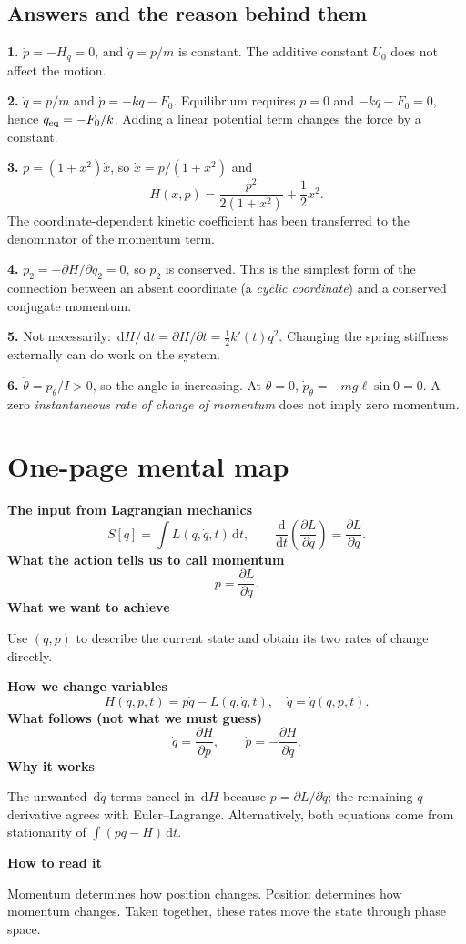 \documentclass[11pt,a4paper,oneside]{article}
\newcommand{\dd}{\,\mathrm d}
\newcommand{\pd}[2]{\frac{\partial #1}{\partial #2}}
\newcommand{\dt}[1]{\frac{\mathrm d #1}{\mathrm d t}}
\begin{document}
\subsection*{Answers and the reason behind them}
\textbf{1.} $\dot p=-H_q=0$, and $\dot q=p/m$ is constant. The additive constant $U_0$ does not affect the motion.

\textbf{2.} $\dot q=p/m$ and $\dot p=-kq-F_0$. Equilibrium requires $p=0$ and $-kq-F_0=0$, hence $q_{\rm eq}=-F_0/k$. Adding a linear potential term changes the force by a constant.

\textbf{3.} $p=(1+x^2)\dot x$, so $\dot x=p/(1+x^2)$ and
\[
 H(x,p)=\frac{p^2}{2(1+x^2)}+\frac12x^2.
\]
The coordinate-dependent kinetic coefficient has been transferred to the denominator of the momentum term.

\textbf{4.} $\dot p_2=-\partial H/\partial q_2=0$, so $p_2$ is conserved. This is the simplest form of the connection between an absent coordinate (a \emph{cyclic coordinate}) and a conserved conjugate momentum.

\textbf{5.} Not necessarily: $\dd H/\dd t=\partial H/\partial t=\tfrac12k'(t)q^2$. Changing the spring stiffness externally can do work on the system.

\textbf{6.} $\dot\theta=p_\theta/I>0$, so the angle is increasing. At $\theta=0$, $\dot p_\theta=-mg\ell\sin0=0$. A zero \emph{instantaneous rate of change of momentum} does not imply zero momentum.

\section{One-page mental map}
\begin{keybox}
\textbf{The input from Lagrangian mechanics}
\[
 S[q]=\int L(q,\dot q,t)\dd t,
 \qquad \dt{}\left(\pd{L}{\dot q}\right)=\pd{L}{q}.
\]
\textbf{What the action tells us to call momentum}
\[
 \boxed{p=\pd{L}{\dot q}.}
\]
\textbf{What we want to achieve}

Use $(q,p)$ to describe the current state and obtain its two rates of change directly.

\textbf{How we change variables}
\[
 \boxed{H(q,p,t)=p\dot q-L(q,\dot q,t),\quad
        \dot q=\dot q(q,p,t).}
\]
\textbf{What follows (not what we must guess)}
\[
 \boxed{\dot q=\pd{H}{p},\qquad\dot p=-\pd{H}{q}.}
\]
\textbf{Why it works}

The unwanted $\dd\dot q$ terms cancel in $\dd H$ because $p=\partial L/\partial\dot q$; the remaining $q$ derivative agrees with Euler--Lagrange. Alternatively, both equations come from stationarity of $\int(p\dot q-H)\dd t$.

\textbf{How to read it}

Momentum determines how position changes. Position determines how momentum changes. Taken together, these rates move the state through phase space.
\end{keybox}
\end{document}
